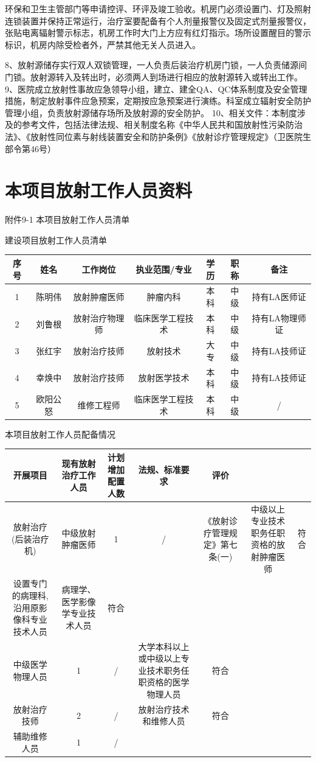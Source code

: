 环保和卫生主管部门等申请控评、环评及竣工验收。机房门必须设置门、灯及照射连锁装置并保持正常运行，治疗室要配备有个人剂量报警仪及固定式剂量报警仪，张贴电离辐射警示标志，机房工作时大门上方应有红灯指示。场所设置醒目的警示标识，机房内除受检者外，严禁其他无关人员进入。

8、放射源储存实行双人双锁管理，一人负责后装治疗机房门锁，一人负责储源间门锁。放射源转入及转出时，必须两人到场进行相应的放射源转入或转出工作。
9、医院成立放射性事故应急领导小组，建立、建全QA、QC体系制度及安全管理措施，制定放射事件应急预案，定期按应急预案进行演练。科室成立辐射安全防护管理小组，负责放射源储存场所及放射源的安全防护。
10、相关文件：本制度涉及的参考文件，包括法律法规、相关制度名称《中华人民共和国放射性污染防治法》、《放射性同位素与射线装置安全和防护条例》《放射诊疗管理规定》（卫医院生部令第46号）

\section{本项目放射工作人员资料}

附件9-1 本项目放射工作人员清单

建设项目放射工作人员清单

\begin{table}[H]
\centering
\begin{tabular}{|c|c|c|c|c|c|c|}
\hline
序号 & 姓名 & 工作岗位 & 执业范围/专业 & 学历 & 职称 & 备注 \\
\hline
1 & 陈明伟 & 放射肿瘤医师 & 肿瘤内科 & 本科 & 中级 & 持有LA医师证 \\
\hline
2 & 刘鲁根 & 放射治疗物理师 & 临床医学工程技术 & 本科 & 中级 & 持有LA物理师证 \\
\hline
3 & 张红宇 & 放射治疗技师 & 放射技术 & 大专 & 中级 & 持有LA技师证 \\
\hline
4 & 幸焕中 & 放射治疗技师 & 放射医学技术 & 本科 & 中级 & 持有LA技师证 \\
\hline
5 & 欧阳公怒 & 维修工程师 & 临床医学工程技术 & 本科 & 中级 & / \\
\hline
\end{tabular}
\end{table}


本项目放射工作人员配备情况

\begin{table}[H]
\centering
\begin{tabular}{|c|c|c|c|c|c|c|}
\hline
开展项目 & 现有放射治疗工作人员 & 计划增加配置人数 & 法规、标准要求 & 评价 &  &  \\
\hline
放射治疗(后装治疗机) & 中级放射肿瘤医师 & 1 & / & 《放射诊疗管理规定》第七条(一) & 中级以上专业技术职务任职资格的放射肿瘤医师 & 符合 \\
\hline
设置专门的病理科,沿用原影像科专业技术人员 & 病理学、医学影像学专业技术人员 & 符合 &  &  &  &  \\
\hline
中级医学物理人员 & 1 & / & 大学本科以上或中级以上专业技术职务任职资格的医学物理人员 & 符合 &  &  \\
\hline
放射治疗技师 & 2 & / & 放射治疗技术和维修人员 & 符合 &  &  \\
\hline
辅助维修人员 & 1 & / &  &  &  &  \\
\hline
\end{tabular}
\end{table}


